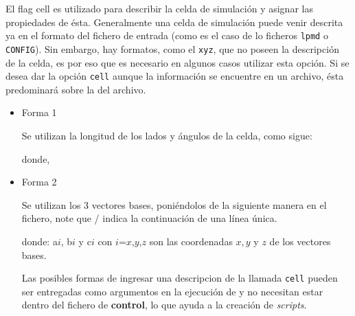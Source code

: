 El flag cell es utilizado para describir la celda de simulaci\'on y asignar las propiedades de \'esta. Generalmente una celda de simulaci\'on puede venir descrita ya en el formato del fichero de entrada (como es el caso de lo ficheros \texttt{lpmd} o \texttt{CONFIG}). Sin embargo, hay formatos, como el \texttt{xyz}, que no poseen la descripci\'on de la celda, es por eso que es necesario en algunos casos utilizar esta opci\'on. Si se desea dar la opci\'on \verb|cell| aunque la informaci\'on se encuentre en un archivo, \'esta predominar\'a sobre la del archivo.

\begin{itemize} 
\item{Forma 1}

Se utilizan la longitud de los lados y \'angulos de la celda, como sigue:


donde,


\item{Forma 2}

Se utilizan los 3 vectores bases, poni\'endolos de la siguiente manera en el fichero, note que / indica la continuaci\'on de una l\'inea \'unica.


donde: a${i}$, b${i}$ y c${i}$ con $i$={$x$,$y$,$z$} son las coordenadas $x, y$ y $z$ de los vectores bases.

Las posibles formas de ingresar una descripcion de la llamada \verb|cell| pueden ser entregadas como argumentos en la ejecuci\'on de {\lpmd} y no necesitan estar dentro del fichero de \textbf{control}, lo que ayuda a la creaci\'on de \textit{scripts}.


\end{itemize}

